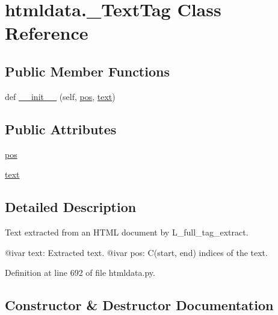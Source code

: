 \hypertarget{classhtmldata_1_1___text_tag}{}\section{htmldata.\+\_\+\+Text\+Tag Class Reference}
\label{classhtmldata_1_1___text_tag}
\subsection*{Public Member Functions}
\begin{DoxyCompactItemize}
\item 
def \hyperlink{classhtmldata_1_1___text_tag_a68fa8e107e766e796737d13aed2b436d}{\+\_\+\+\_\+init\+\_\+\+\_\+} (self, \hyperlink{classhtmldata_1_1___text_tag_aed80e52db18c71dfe1688b474cc3b0a3}{pos}, \hyperlink{classhtmldata_1_1___text_tag_a84842987d8e0a968fb09dd4de42e05bb}{text})
\end{DoxyCompactItemize}
\subsection*{Public Attributes}
\begin{DoxyCompactItemize}
\item 
\hyperlink{classhtmldata_1_1___text_tag_aed80e52db18c71dfe1688b474cc3b0a3}{pos}
\item 
\hyperlink{classhtmldata_1_1___text_tag_a84842987d8e0a968fb09dd4de42e05bb}{text}
\end{DoxyCompactItemize}


\subsection{Detailed Description}
\begin{DoxyVerb}Text extracted from an HTML document by L{_full_tag_extract}.

@ivar text:   Extracted text.
@ivar pos:    C{(start, end)} indices of the text.
\end{DoxyVerb}
 

Definition at line 692 of file htmldata.\+py.



\subsection{Constructor \& Destructor Documentation}

